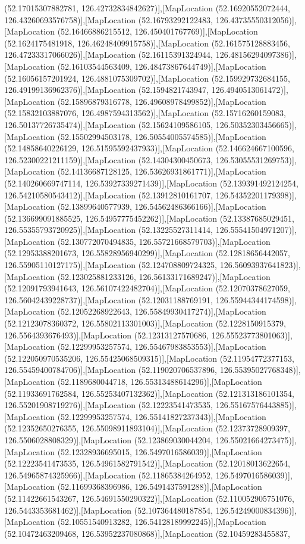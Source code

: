 (52.17015307882781, 126.42732834842627)],[MapLocation (52.16920552072444, 126.43260693576758)],[MapLocation (52.16793292122483, 126.43735550312056)],[MapLocation (52.16466886215512, 126.450401767769)],[MapLocation (52.1624175481918, 126.46248409915758)],[MapLocation (52.161575128883456, 126.47233317066026)],[MapLocation (52.16115391324944, 126.48156294097386)],[MapLocation (52.16103544563409, 126.48473867644749)],[MapLocation (52.16056157201924, 126.4881075309702)],[MapLocation (52.159929732684155, 126.49199136962376)],[MapLocation (52.1594821743947, 126.4940513061472)],[MapLocation (52.15896879316778, 126.49608978499852)],[MapLocation (52.15832103887076, 126.4987594313562)],[MapLocation (52.15716260159083, 126.50137726735474)],[MapLocation (52.15624109586105, 126.50352303456665)],[MapLocation (52.15502994503178, 126.50554005574585)],[MapLocation (52.14858640226129, 126.51595592437933)],[MapLocation (52.146624667100596, 126.52300221211159)],[MapLocation (52.14304300450673, 126.53055531269753)],[MapLocation (52.14136687128125, 126.53626931861771)],[MapLocation (52.140260669747114, 126.53927339271439)],[MapLocation (52.139391492124254, 126.54210580543412)],[MapLocation (52.13912810161707, 126.54352201179398)],[MapLocation (52.13899640577939, 126.54562486366166)],[MapLocation (52.136699091885525, 126.54957775452262)],[MapLocation (52.13387685029451, 126.55355793720925)],[MapLocation (52.13225527311414, 126.55541504971207)],[MapLocation (52.130772070494835, 126.55721668579703)],[MapLocation (52.12953388201673, 126.55828956940299)],[MapLocation (52.12818656442057, 126.55905110127175)],[MapLocation (52.124708809724325, 126.56093937641823)],[MapLocation (52.123025881233126, 126.56133171689247)],[MapLocation (52.12091793941643, 126.56107422482704)],[MapLocation (52.12070378627059, 126.56042439228737)],[MapLocation (52.12031188769191, 126.55944344174598)],[MapLocation (52.12052268922643, 126.55849930417274)],[MapLocation (52.12123078360372, 126.55802113301003)],[MapLocation (52.1228150915379, 126.5564393676493)],[MapLocation (52.12313127570686, 126.55523773801063)],[MapLocation (52.12299953257574, 126.55467983853553)],[MapLocation (52.122050970535206, 126.55425068509315)],[MapLocation (52.11954772377153, 126.55459400784706)],[MapLocation (52.119020706537896, 126.55395027768348)],[MapLocation (52.1189680044718, 126.55313488614296)],[MapLocation (52.11933691762584, 126.55253407132362)],[MapLocation (52.121313186101354, 126.55201908719276)],[MapLocation (52.12223541473535, 126.55167576443885)],[MapLocation (52.12299953257574, 126.55141827237343)],[MapLocation (52.12352650276355, 126.55098911893104)],[MapLocation (52.12373728909397, 126.5506028808329)],[MapLocation (52.123869030044204, 126.55021664273475)],[MapLocation (52.12328936695015, 126.5497016586039)],[MapLocation (52.12223541473535, 126.54961582791542)],[MapLocation (52.12018013622654, 126.54965874325966)],[MapLocation (52.11865384264952, 126.5497016586039)],[MapLocation (52.11699368396986, 126.5491437591288)],[MapLocation (52.11422661543267, 126.54691550290322)],[MapLocation (52.110052905751076, 126.5443353681462)],[MapLocation (52.107364480187854, 126.54249000834396)],[MapLocation (52.10551540913282, 126.54128189992245)],[MapLocation (52.10472463209468, 126.53952237080868)],[MapLocation (52.10459283455837, 